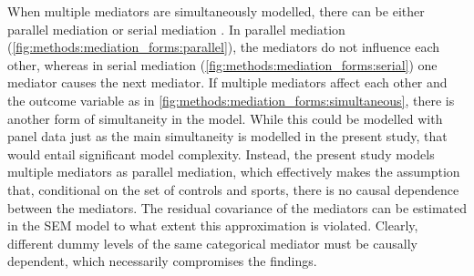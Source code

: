 When multiple mediators are simultaneously modelled, there can be either parallel mediation or serial mediation \cite{hayes2017introduction}.
In parallel mediation (\cref{fig:methods:mediation_forms:parallel}), the mediators do not influence each other,
whereas in serial mediation (\cref{fig:methods:mediation_forms:serial}) one mediator causes the next mediator.
If multiple mediators affect each other and the outcome variable as in \cref{fig:methods:mediation_forms:simultaneous},
there is another form of simultaneity in the model. While this could be modelled with panel data just as the main
simultaneity is modelled in the present study, that would entail significant model complexity.
Instead, the present study models multiple mediators as parallel mediation, which effectively makes the assumption that,
conditional on the set of controls and sports, there is no causal dependence between the mediators.
The residual covariance of the mediators can be estimated in the SEM model to what extent this approximation is violated.
Clearly, different dummy levels of the same categorical mediator must be causally dependent, which necessarily
compromises the findings.

